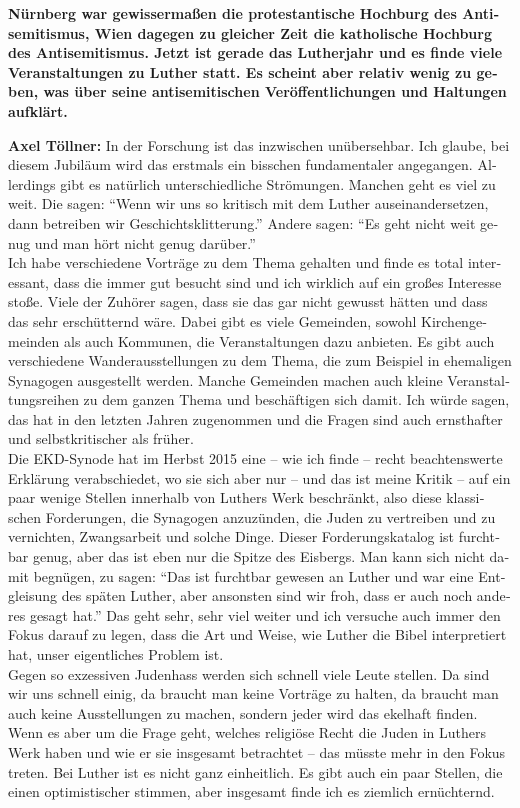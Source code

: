 \begin{otherlanguage}{ngerman}
\textbf{Nürnberg war gewissermaßen die protestantische Hochburg des Antisemitismus, Wien dagegen zu gleicher Zeit die katholische Hochburg des Antisemitismus. 
Jetzt ist gerade das Lutherjahr und es finde viele Veranstaltungen zu Luther statt. Es scheint aber relativ wenig zu geben, was über seine antisemitischen Veröffentlichungen und Haltungen aufklärt.} 

\textbf{Axel Töllner:} In der Forschung ist das inzwischen unübersehbar. Ich glaube, bei diesem Jubiläum wird das erstmals ein bisschen fundamentaler angegangen. Allerdings gibt es natürlich unterschiedliche Strömungen. Manchen geht es viel zu weit. Die sagen: "`Wenn wir uns so kritisch mit dem Luther auseinandersetzen, dann betreiben wir Geschichtsklitterung."' Andere sagen: "`Es geht nicht weit genug und man hört nicht genug darüber."'\\ 
Ich habe verschiedene Vorträge zu dem Thema gehalten und finde es total interessant, dass die immer gut besucht sind und ich wirklich auf ein großes Interesse stoße. Viele der Zuhörer sagen, dass sie das gar nicht gewusst hätten und dass das sehr erschütternd wäre. Dabei gibt es viele Gemeinden, sowohl Kirchengemeinden als auch Kommunen, die Veranstaltungen dazu anbieten. Es gibt auch verschiedene Wanderausstellungen zu dem Thema, die zum Beispiel in ehemaligen Synagogen ausgestellt werden. Manche Gemeinden machen auch kleine Veranstaltungsreihen zu dem ganzen Thema und beschäftigen sich damit. Ich würde sagen, das hat in den letzten Jahren zugenommen und die Fragen sind auch ernsthafter und selbstkritischer als früher.\\  
Die EKD-Synode hat im Herbst 2015 eine – wie ich finde – recht beachtenswerte Erklärung verabschiedet, wo sie sich aber nur – und das ist meine Kritik – auf ein paar wenige Stellen innerhalb von Luthers Werk beschränkt, also diese klassischen Forderungen, die Synagogen anzuzünden, die Juden zu vertreiben und zu vernichten, Zwangsarbeit und solche Dinge. Dieser Forderungskatalog ist furchtbar genug, aber das ist eben nur die Spitze des Eisbergs. Man kann sich nicht damit begnügen, zu sagen: "`Das ist furchtbar gewesen an Luther und war eine Entgleisung des späten Luther, aber ansonsten sind wir froh, dass er auch noch anderes gesagt hat."' Das geht sehr, sehr viel weiter und ich versuche auch immer den Fokus darauf zu legen, dass die Art und Weise, wie Luther die Bibel interpretiert hat, unser eigentliches Problem ist.\\ 
Gegen so exzessiven Judenhass werden sich schnell viele Leute stellen. Da sind wir uns schnell einig, da braucht man keine Vorträge zu halten, da braucht man auch keine Ausstellungen zu machen, sondern jeder wird das ekelhaft finden. Wenn es aber um die Frage geht, welches religiöse Recht die Juden in Luthers Werk haben und wie er sie insgesamt betrachtet – das müsste mehr in den Fokus treten. Bei Luther ist es nicht ganz einheitlich. Es gibt auch ein paar Stellen, die einen optimistischer stimmen, aber insgesamt finde ich es ziemlich ernüchternd. 
 

\end{otherlanguage}
